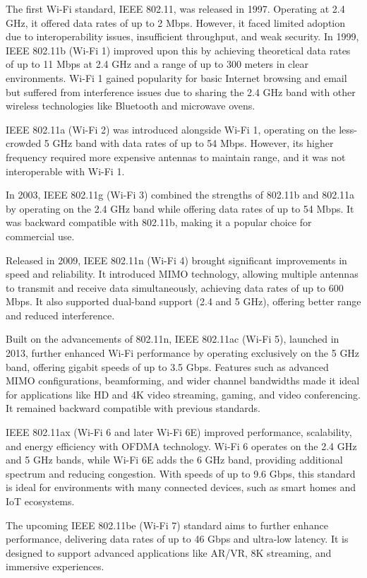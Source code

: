 The first Wi-Fi standard, IEEE 802.11, was released in 1997. Operating at 2.4 GHz, it offered data rates of up to 2 Mbps. However, it faced limited adoption due to interoperability issues, insufficient throughput, and weak security. In 1999, IEEE 802.11b (Wi-Fi 1) improved upon this by achieving theoretical data rates of up to 11 Mbps at 2.4 GHz and a range of up to 300 meters in clear environments. Wi-Fi 1 gained popularity for basic Internet browsing and email but suffered from interference issues due to sharing the 2.4 GHz band with other wireless technologies like Bluetooth and microwave ovens.

IEEE 802.11a (Wi-Fi 2) was introduced alongside Wi-Fi 1, operating on the less-crowded 5 GHz band with data rates of up to 54 Mbps. However, its higher frequency required more expensive antennas to maintain range, and it was not interoperable with Wi-Fi 1. 

In 2003, IEEE 802.11g (Wi-Fi 3) combined the strengths of 802.11b and 802.11a by operating on the 2.4 GHz band while offering data rates of up to 54 Mbps. It was backward compatible with 802.11b, making it a popular choice for commercial use.

Released in 2009, IEEE 802.11n (Wi-Fi 4) brought significant improvements in speed and reliability. It introduced \ac{MIMO} technology, allowing multiple antennas to transmit and receive data simultaneously, achieving data rates of up to 600 Mbps. It also supported dual-band support (2.4 and 5 GHz), offering better range and reduced interference.

Built on the advancements of 802.11n, IEEE 802.11ac (Wi-Fi 5), launched in 2013, further enhanced Wi-Fi performance by operating exclusively on the 5 GHz band, offering gigabit speeds of up to 3.5 Gbps. Features such as advanced MIMO configurations, beamforming, and wider channel bandwidths made it ideal for applications like \ac{HD} and 4K video streaming, gaming, and video conferencing. It remained backward compatible with previous standards.

IEEE 802.11ax (Wi-Fi 6 and later Wi-Fi 6E) improved performance, scalability, and energy efficiency with \ac{OFDMA} technology. Wi-Fi 6 operates on the 2.4 GHz and 5 GHz bands, while Wi-Fi 6E adds the 6 GHz band, providing additional spectrum and reducing congestion. With speeds of up to 9.6 Gbps, this standard is ideal for environments with many connected devices, such as smart homes and IoT ecosystems.

The upcoming IEEE 802.11be (Wi-Fi 7) standard aims to further enhance performance, delivering data rates of up to 46 Gbps and ultra-low latency. It is designed to support advanced applications like AR/VR, 8K streaming, and immersive experiences.

